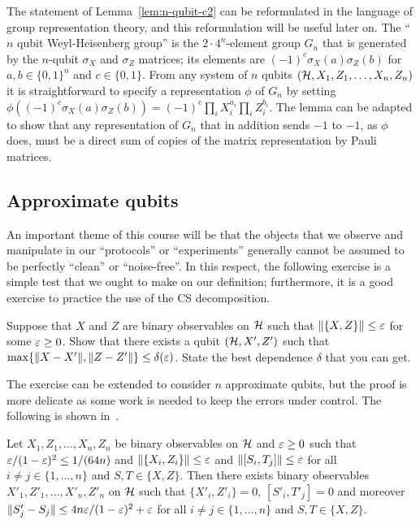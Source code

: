 \begin{remark}
The statement of Lemma~\ref{lem:n-qubit-c2} can be reformulated in the language of group representation theory, and this reformulation will be useful later on. The ``$n$ qubit Weyl-Heisenberg group'' is the $2\cdot 4^n$-element group $G_n$ that is generated by the $n$-qubit $\sigma_X$ and $\sigma_Z$ matrices; its elements are $(-1)^c\sigma_X(a)\sigma_Z(b)$ for $a,b\in\{0,1\}^n$ and $c\in\{0,1\}$. From any system of $n$ qubits $(\mathcal{H},X_1,Z_1,\ldots,X_n,Z_n)$ it is straightforward to specify a representation $\phi$ of $G_n$ by setting $\phi((-1)^c\sigma_X(a)\sigma_Z(b)) = (-1)^c \prod_i X_i^{a_i} \prod_i Z_i^{b_i}$. The lemma can be adapted to show that any representation of $G_n$ that in addition sends $-1$ to $-1$, as $\phi$ does, must be a direct sum of copies of the matrix representation by Pauli matrices. 
\end{remark}

\subsection{Approximate qubits}

An important theme of this course will be that the objects that we observe and manipulate in our ``protocols'' or ``experiments'' generally cannot be assumed to be perfectly ``clean'' or ``noise-free''. In this respect, the following exercise is a simple test that we ought to make on our definition; furthermore, it is a good exercise to practice the use of the CS decomposition. 

\begin{exercise}
Suppose that $X$ and $Z$ are binary observables on $\mathcal{H}$ such that $\|\{X,Z\}\|\leq \varepsilon$ for some $\varepsilon \geq 0$. Show that there exists a qubit $(\mathcal{H},X',Z')$ such that $\max\{\|X-X'\|,\|Z-Z'\|\} \leq \delta(\varepsilon)$. State the best dependence $\delta$ that you can get. 
\end{exercise} 

The exercise can be extended to consider $n$ approximate qubits, but the proof is more delicate as some work is needed to keep the errors under control. The following is shown in~\cite{chao2017overlapping}. 

\begin{theorem}
Let $X_1,Z_1,\ldots,X_n,Z_n$ be binary observables on $\mathcal{H}$ and $\varepsilon \geq 0$ such that $\varepsilon/(1-\varepsilon)^2 \leq 1/(64n)$ and $\|\{X_i,Z_i\}\|\leq \varepsilon$ and $\|[S_i,T_j]\|\leq \varepsilon$ for all $i\neq j \in \{1,\ldots, n\}$ and $S,T \in \{X,Z\}$. Then there exists  binary observables $X'_1,Z'_1,\ldots,X'_n,Z'_n$ on $\mathcal{H}$ such that $\{X'_i,Z'_i\}=0$, $[S'_i,T'_j]=0$ and moreover $\|S'_j-S_j\| \leq 4n\varepsilon/(1-\varepsilon)^2 + \varepsilon$ for all $i\neq j\in \{1,\ldots,n\}$ and $S,T\in\{X,Z\}$.
\end{theorem}


